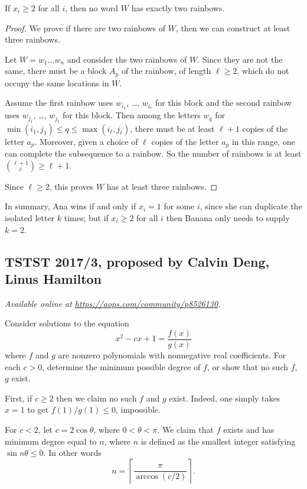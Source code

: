 \documentclass[11pt]{scrartcl}
\begin{document}
\begin{claim*}
  If $x_i \ge 2$ for all $i$, then no word $W$ has exactly two rainbows.
\end{claim*}
\begin{proof}
  We prove if there are two rainbows of $W$, then we can construct
  at least three rainbows.

  Let $W = w_1 \dots w_n$ and consider the two rainbows of $W$.
  Since they are not the same,
  there must be a block $A_p$ of the rainbow,
  of length $\ell \ge 2$,
  which do not occupy the same locations in $W$.

  Assume the first rainbow uses $w_{i_1}$, \dots, $w_{i_\ell}$ for this block
  and the second rainbow uses $w_{j_1}$, \dots, $w_{j_\ell}$ for this block.
  Then among the letters $w_q$ for
  $\min(i_1, j_1) \le q \le \max(i_\ell, j_\ell)$,
  there must be at least $\ell+1$ copies of the letter $a_p$.
  Moreover, given a choice of $\ell$ copies of the letter $a_p$
  in this range, one can complete the subsequence to a rainbow.
  So the number of rainbows is at least $\binom{\ell+1}{\ell} \ge \ell+1$.

  Since $\ell \ge 2$, this proves $W$ has at least three rainbows.
\end{proof}

In summary, Ana wins if and only if $x_i = 1$ for some $i$,
since she can duplicate the isolated letter $k$ times;
but if $x_i \ge 2$ for all $i$ then Banana only needs to supply $k = 2$.
\pagebreak

\subsection{TSTST 2017/3, proposed by Calvin Deng, Linus Hamilton}
\textsl{Available online at \url{https://aops.com/community/p8526130}.}
\begin{mdframed}[style=mdpurplebox,frametitle={Problem statement}]
Consider solutions to the equation
\[ x^2 - cx + 1 = \frac{f(x)}{g(x)} \]
where $f$ and $g$ are nonzero polynomials with nonnegative real coefficients.
For each $c > 0$, determine the minimum possible degree of $f$, or show
that no such $f$, $g$ exist.
\end{mdframed}
First, if $c \ge 2$ then we claim no such $f$ and $g$ exist.
Indeed, one simply takes $x=1$ to get $f(1)/g(1) \le 0$, impossible.

For $c < 2$, let $c = 2 \cos \theta$, where $0 < \theta < \pi$.
We claim that $f$ exists and has minimum degree equal to $n$,
where $n$ is defined as the smallest integer
satisfying $\sin n\theta \le 0$.
In other words
\[ n = \left\lceil \frac{\pi}{\arccos(c/2)} \right\rceil. \]
\end{document}
